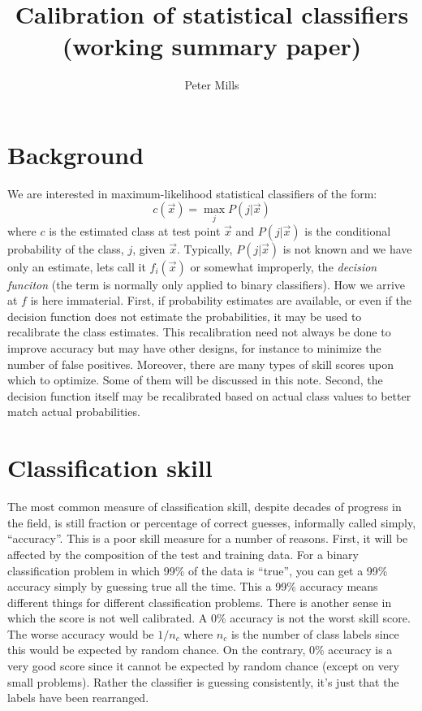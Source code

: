 \documentclass{article}
\begin{document}
\title{Calibration of statistical classifiers\\
(working summary paper)}


\author{Peter Mills\\}

\maketitle

\section{Background}

We are interested in maximum-likelihood statistical classifiers of the form:
\begin{equation}
	c(\vec x)=\max_j P(j|\vec x)
\end{equation}
where $c$ is the estimated class at test point $\vec x$ and
$P(j|\vec x)$ is the conditional probability of the class, $j$,
given $\vec x$.
Typically, $P(j|\vec x)$ is not known and we have only an estimate, 
lets call it $f_i(\vec x)$ or somewhat improperly, the {\it decision funciton}
(the term is normally only applied to binary classifiers).
How we arrive at $f$ is here immaterial. 
First, if probability estimates are available, or even if the decision function
does not estimate the probabilities, it may be used to recalibrate the class
estimates.
This recalibration need not always be done to improve accuracy but may have
other designs, for instance to minimize the number of false positives.
Moreover, there are many types of skill scores upon which to optimize.
Some of them will be discussed in this note.
Second, the decision function itself may be recalibrated based on
actual class values to better match actual probabilities.


\section{Classification skill}


The most common measure of classification skill, despite decades of progress
in the field, is still fraction or percentage of correct guesses, informally
called simply, ``accuracy''.
This is a poor skill measure for a number of reasons.
First, it will be affected by the composition of the test and training data.
For a binary classification problem in which 99\% of the data is ``true'',
you can get a 99\% accuracy simply by guessing true all the time.
This a 99\% accuracy means different things for different classification
problems.
There is another sense in which the score is not well calibrated.
A 0\% accuracy is not the worst skill score.
The worse accuracy would be $1/n_c$ where $n_c$ is the number of class labels
since this would be expected by random chance.
On the contrary, 0\% accuracy is a very good score since it cannot be 
expected by random chance (except on very small problems).
Rather the classifier is guessing consistently, it's just that the labels
have been rearranged.
\end{document}
